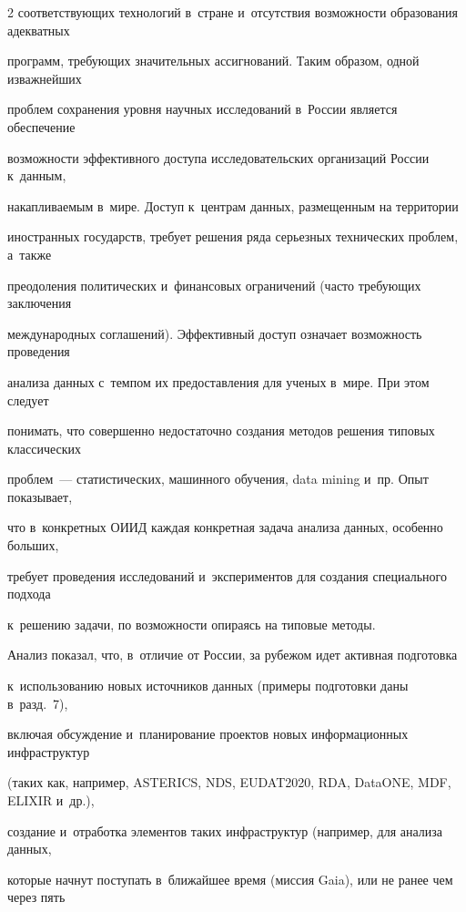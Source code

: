 \begin{multicols}{2}
соответствующих технологий в~стране и~отсутствия возможности образования адекватных 


программ, тре\-бу\-ющих значительных ассигнований. Таким образом, одной из\linebreak важнейших 


проблем сохранения уровня научных исследований в~России является обеспечение\linebreak 


возможности эффективного доступа исследовательских организаций России к~данным, 


накапливаемым в~мире. Доступ к~центрам данных, размещенным на территории 


иностранных государств, требует решения ряда серьезных технических проблем, а~так\-же 


преодоления политических и~финансовых ограничений (часто требующих заключения 


международных соглашений). Эффективный доступ означает возможность проведения 


анализа данных с~темпом их предоставления для ученых в~мире. При этом следует 


понимать, что совершенно недостаточно создания методов решения типовых классических 


проб\-лем~--- статистических, машинного обучения, data mining и~пр. Опыт показывает, 


что в~конкретных ОИИД каждая конкретная задача анализа данных, особенно больших, 


требует проведения исследований и~экспериментов для создания специального подхода 


к~решению задачи, по возможности опираясь на типовые методы.


  


  Анализ показал, что, в~отличие от России, за рубежом идет активная подготовка 


к~использованию новых источников данных (примеры подготовки даны в~разд.~7), 


включая обсуждение и~планирование проектов новых информационных инфраструктур 


(таких как, например, ASTERICS, NDS, EUDAT2020, RDA, DataONE, MDF, ELIXIR и~др.), 


создание и~отработка элементов таких инфраструктур (например, для анализа данных, 


которые нач\-нут поступать в~ближайшее время (миссия Gaia), или не ранее чем через пять 



\end{multicols}
